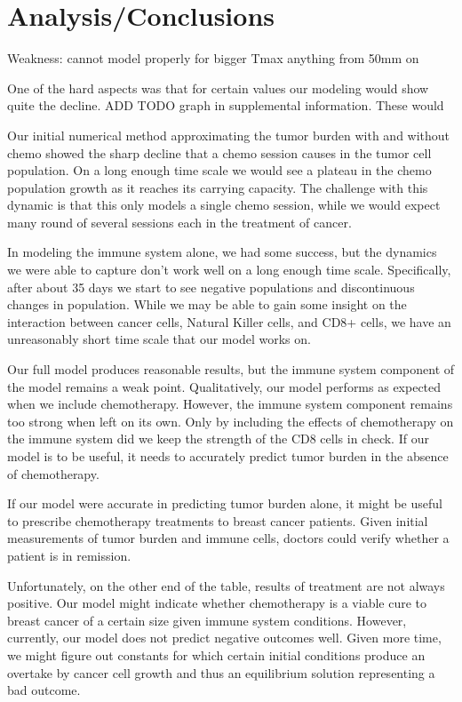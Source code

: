 \documentclass[11pt]{amsart}
\begin{document}
\section{Analysis/Conclusions}

Weakness: cannot model properly for bigger Tmax anything from 50mm on

One of the hard aspects was that for certain values our modeling would show quite the decline.
ADD TODO graph in supplemental information.
These would 

Our initial numerical method approximating the tumor burden with and without chemo showed the sharp decline that a chemo session causes in the tumor cell population. 
On a long enough time scale we would see a plateau in the chemo population growth as it reaches its carrying capacity. 
The challenge with this dynamic is that this only models a single chemo session, 
while we would expect many round of several sessions each in the treatment of cancer.

In modeling the immune system alone, we had some success, 
but the dynamics we were able to capture don't work well on a long enough time scale. 
Specifically, after about 35 days we start to see negative populations and discontinuous changes 
in population. While we may be able to gain some insight on the interaction between cancer cells, 
Natural Killer cells, and CD8+ cells, we have an unreasonably short time scale that our model works on. 

Our full model produces reasonable results, but the immune system component of the model remains a weak point. Qualitatively, our model performs as expected when we include chemotherapy. However, the immune system component remains too strong when left on its own. Only by including the effects of chemotherapy on the immune system did we keep the strength of the CD8 cells in check. If our model is to be useful, it needs to accurately predict tumor burden in the absence of chemotherapy.

If our model were accurate in predicting tumor burden alone, it might be useful to prescribe chemotherapy treatments to breast cancer patients. Given initial measurements of tumor burden and immune cells, doctors could verify whether a patient is in remission. 

Unfortunately, on the other end of the table, results of treatment are not always positive. Our model might indicate whether chemotherapy is a viable cure to breast cancer of a certain size given immune system conditions. However, currently, our model does not predict negative outcomes well. Given more time, we might figure out constants for which certain initial conditions produce an overtake by cancer cell growth and thus an equilibrium solution representing a bad outcome.
\end{document}
